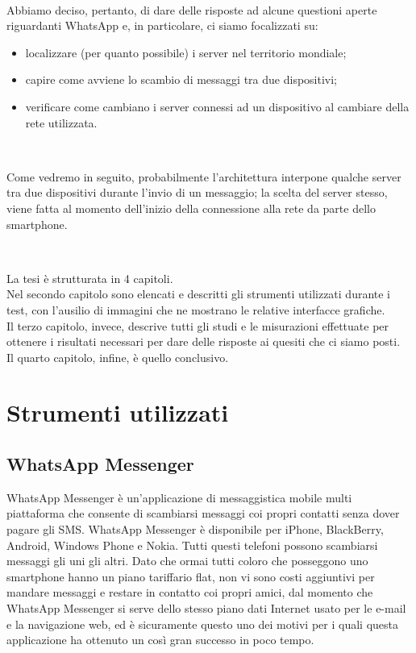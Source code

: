 \documentclass[a4paper,11pt]{book}
\begin{document}
~

Abbiamo deciso, pertanto, di dare delle risposte ad alcune questioni aperte riguardanti WhatsApp e, in particolare, ci siamo focalizzati su:
\begin{itemize}
 \item localizzare (per quanto possibile) i server nel territorio mondiale;
 \item capire come avviene lo scambio di messaggi tra due dispositivi;
 \item verificare come cambiano i server connessi ad un dispositivo al cambiare della rete utilizzata.
\end{itemize}

~

Come vedremo in seguito, probabilmente l'architettura interpone qualche server tra due dispositivi durante l'invio di un messaggio; la scelta del server stesso, viene fatta al momento dell'inizio della connessione alla rete da parte dello smartphone.

~

La tesi \`e strutturata in 4 capitoli.\\
Nel secondo capitolo sono elencati e descritti gli strumenti utilizzati durante i test, con l'ausilio di immagini che ne mostrano le relative interfacce grafiche. \\
Il terzo capitolo, invece, descrive tutti gli studi e le misurazioni effettuate per ottenere i risultati necessari per dare delle risposte ai quesiti che ci siamo posti.\\
Il quarto capitolo, infine, \`e quello conclusivo.

\chapter{Strumenti utilizzati}

\section{WhatsApp Messenger}
WhatsApp Messenger \`e un'applicazione di messaggistica mobile multi piattaforma che consente di scambiarsi messaggi coi propri contatti senza dover pagare gli SMS. WhatsApp Messenger \`e disponibile per iPhone, BlackBerry, Android, Windows Phone e Nokia. Tutti questi telefoni possono scambiarsi messaggi gli uni gli altri. Dato che ormai tutti coloro che posseggono uno smartphone hanno un piano tariffario flat, non vi sono costi aggiuntivi per mandare messaggi e restare in contatto coi propri amici, dal momento che WhatsApp Messenger si serve dello stesso piano dati Internet usato per le e-mail e la navigazione web, ed \`e sicuramente questo uno dei motivi per i quali questa applicazione ha ottenuto un cos\`i gran successo in poco tempo.
\end{document}
